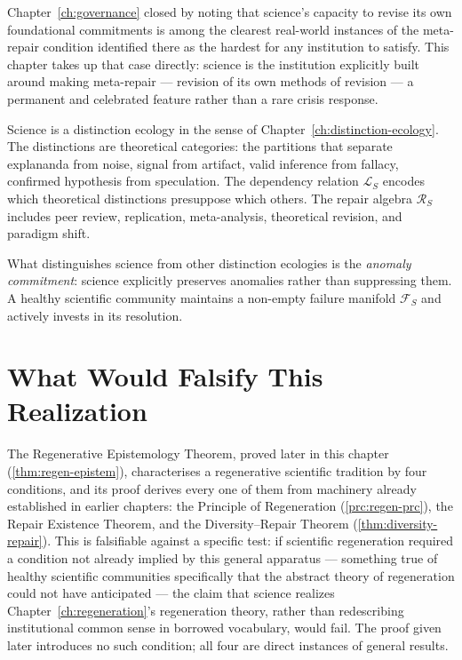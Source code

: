 \documentclass[12pt,twoside,openright]{book}
\begin{document}
Chapter~\ref{ch:governance} closed by noting that science's
capacity to revise its own foundational commitments is among
the clearest real-world instances of the meta-repair
condition identified there as the hardest for any institution
to satisfy. This chapter takes up that case directly: science
is the institution explicitly built around making meta-repair
--- revision of its own methods of revision --- a permanent
and celebrated feature rather than a rare crisis response.

Science is a distinction ecology in the sense of
Chapter~\ref{ch:distinction-ecology}. The distinctions
are theoretical categories: the partitions that
separate explananda from noise, signal from artifact,
valid inference from fallacy, confirmed hypothesis
from speculation. The dependency relation
$\mathcal{L}_S$ encodes which theoretical distinctions
presuppose which others. The repair algebra
$\mathcal{R}_S$ includes peer review, replication,
meta-analysis, theoretical revision, and paradigm shift.

What distinguishes science from other distinction
ecologies is the \emph{anomaly commitment}: science
explicitly preserves anomalies rather than suppressing
them. A healthy scientific community maintains a
non-empty failure manifold $\mathcal{F}_S$ and
actively invests in its resolution.

\section{What Would Falsify This Realization}
\label{sec:ch29-falsifiability}

The Regenerative Epistemology Theorem, proved later in this
chapter (\cref{thm:regen-epistem}), characterises a
regenerative scientific tradition by four conditions, and its
proof derives every one of them from machinery already
established in earlier chapters: the Principle of
Regeneration (\cref{prc:regen-prc}), the Repair Existence
Theorem, and the Diversity--Repair Theorem
(\cref{thm:diversity-repair}). This is falsifiable against a
specific test: if scientific regeneration required a
condition not already implied by this general apparatus ---
something true of healthy scientific communities specifically
that the abstract theory of regeneration could not have
anticipated --- the claim that science realizes
Chapter~\ref{ch:regeneration}'s regeneration theory, rather
than redescribing institutional common sense in borrowed
vocabulary, would fail. The proof given later introduces no
such condition; all four are direct instances of general
results.
\end{document}
